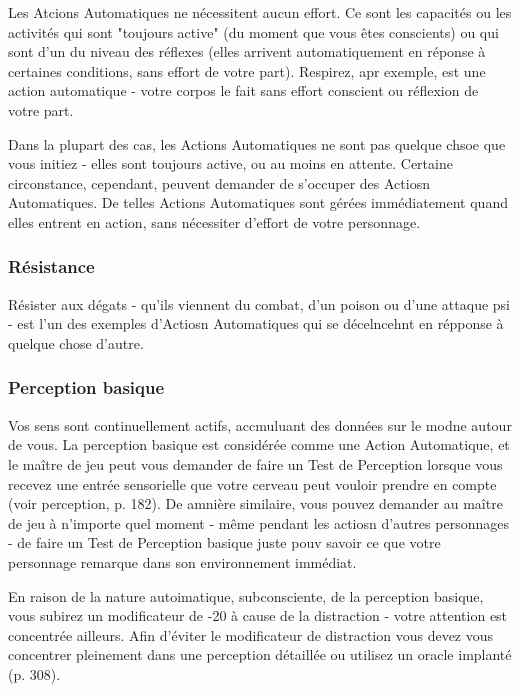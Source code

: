Les Atcions Automatiques ne nécessitent aucun effort. Ce sont les capacités ou les activités qui sont "toujours active" (du moment que vous êtes conscients) ou qui sont d'un du niveau des réflexes (elles arrivent automatiquement en réponse à certaines conditions, sans effort de votre part). Respirez, apr exemple, est une action automatique - votre corpos le fait sans effort conscient ou réflexion de votre part. 

Dans la plupart des cas, les Actions Automatiques ne sont pas quelque chsoe que vous initiez - elles sont toujours active, ou au moins en attente. Certaine circonstance, cependant, peuvent demander de s'occuper des Actiosn Automatiques. De telles Actions Automatiques sont gérées immédiatement quand elles entrent en action, sans nécessiter d'effort de votre personnage. 

\subsubsection{Résistance} 

Résister aux dégats - qu'ils viennent du combat, d'un poison ou d'une attaque psi - est l'un des exemples d'Actiosn Automatiques qui se décelncehnt en répponse à quelque chose d'autre. 

\subsubsection{Perception basique} 

Vos sens sont continuellement actifs, accmuluant des données sur le modne autour de vous. La perception basique est considérée comme une Action Automatique, et le maître de jeu peut vous demander de faire un Test de Perception lorsque vous recevez une entrée sensorielle que votre cerveau peut vouloir prendre en compte (voir perception, p. 182). De amnière similaire, vous pouvez demander au maître de jeu à n'importe quel moment - même pendant les actiosn d'autres personnages - de faire un Test de Perception basique juste pouv savoir ce que votre personnage remarque dans son environnement immédiat. 

En raison de la nature autoimatique, subconsciente, de la perception basique, vous subirez un modificateur de -20 à cause de la distraction - votre attention est concentrée ailleurs. Afin d'éviter le modificateur de distraction vous devez vous concentrer pleinement dans une perception détaillée ou utilisez un oracle implanté (p. 308). 



